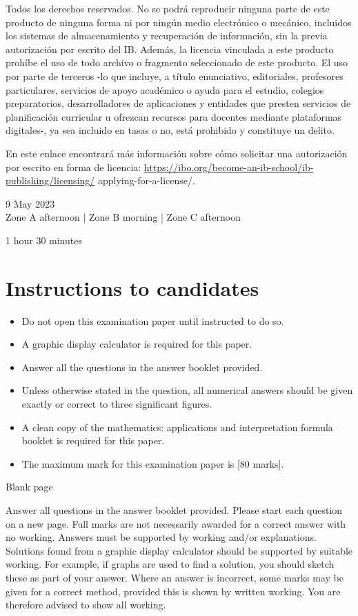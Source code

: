 \documentclass[10pt]{article}
\begin{document}
Todos los derechos reservados. No se podrá reproducir ninguna parte de este producto de ninguna forma ni por ningún medio electrónico o mecánico, incluidos los sistemas de almacenamiento y recuperación de información, sin la previa autorización por escrito del IB. Además, la licencia vinculada a este producto prohíbe el uso de todo archivo o fragmento seleccionado de este producto. El uso por parte de terceros -lo que incluye, a título enunciativo, editoriales, profesores particulares, servicios de apoyo académico o ayuda para el estudio, colegios preparatorios, desarrolladores de aplicaciones y entidades que presten servicios de planificación curricular u ofrezcan recursos para docentes mediante plataformas digitales-, ya sea incluido en tasas o no, está prohibido y constituye un delito.

En este enlace encontrará más información sobre cómo solicitar una autorización por escrito en forma de licencia: \href{https://ibo.org/become-an-ib-school/ib-publishing/licensing/}{https://ibo.org/become-an-ib-school/ib-publishing/licensing/} applying-for-a-license/.

9 May 2023\\
Zone A afternoon | Zone B morning | Zone C afternoon

1 hour 30 minutes

\section*{Instructions to candidates}
\begin{itemize}
  \item Do not open this examination paper until instructed to do so.
  \item A graphic display calculator is required for this paper.
  \item Answer all the questions in the answer booklet provided.
  \item Unless otherwise stated in the question, all numerical answers should be given exactly or correct to three significant figures.
  \item A clean copy of the mathematics: applications and interpretation formula booklet is required for this paper.
  \item The maximum mark for this examination paper is [80 marks].
\end{itemize}

Blank page

Answer all questions in the answer booklet provided. Please start each question on a new page. Full marks are not necessarily awarded for a correct answer with no working. Answers must be supported by working and/or explanations. Solutions found from a graphic display calculator should be supported by suitable working. For example, if graphs are used to find a solution, you should sketch these as part of your answer. Where an answer is incorrect, some marks may be given for a correct method, provided this is shown by written working. You are therefore advised to show all working.
\end{document}
